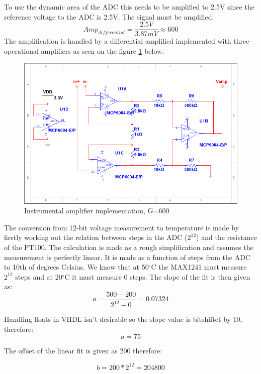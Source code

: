To use the dynamic area of the ADC this needs to be amplified to 2.5V since the reference voltage to the ADC is 2.5V. The signal must be amplified:
\begin{equation}
	Amp_{differential}=\frac{2.5V}{3.87mV}\approx600
\end{equation}
The amplification is handled by a differential amplified implemented with three operational amplifiers as seen on the figure \ref{fig:inst_amp_imp} below.

\begin{figure}[H]
	\centering
	\includegraphics[width=.7\textwidth]{billeder/diff_amp_imp}
	\caption{Instrumental amplifier implementation, G=600}
	\label{fig:inst_amp_imp}
\end{figure}

The conversion from 12-bit voltage measurement to temperature is made by firstly working out the relation between steps in the ADC ($2^{12}$) and the resistance of the PT100. The calculation is made as a rough simplification and assumes the measurement is perfectly linear. It is made as a function of steps from the ADC to 10th of degrees Celsius. We know that at 50$^\circ$C the MAX1241 must measure $2^{12}$ steps and at 20$^\circ$C it must measure 0 steps. The slope of the fit is then given as:
\begin{equation}
	a=\frac{500-200}{2^{12}-0}=0.07324
\end{equation}

Handling floats in VHDL isn't desirable so the slope value is bitshiftet by 10, therefore:
\begin{equation}
	a=75
\end{equation}

The offset of the linear fit is given as 200 therefore:

\begin{equation}
	b=200*2^{12}=204800
\end{equation}

